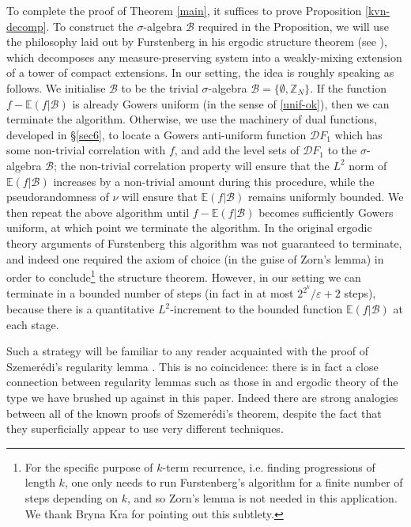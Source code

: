 \documentclass[12pt,a4paper,reqno]{amsart}
\numberwithin{equation}{section}
\theoremstyle{plain}
\theoremstyle{definition}
\def\B{{\mathcal B}}
\def\D{{\mathcal D}}
\def\Z{{\mathbb Z}}
\def\E{{\mathbb E}}
\def\eps{{\varepsilon}}
\def\vs{\vspace{11pt}}
\def\ni{\noindent}
\begin{document}
\ni To complete the proof of Theorem \ref{main}, it suffices to prove Proposition \ref{kvn-decomp}.  To construct the $\sigma$-algebra $\B$
required in the Proposition, we will use the philosophy laid out by Furstenberg in his ergodic structure theorem (see \cite{furst,FKO}), which decomposes any measure-preserving system into a weakly-mixing extension of a tower of compact extensions.  
In our setting, the idea is roughly speaking as follows.  We initialise $\B$ to be the trivial $\sigma$-algebra $\B = \{ \emptyset, \Z_N \}$.
If the function $f - \E(f|\B)$ is already Gowers uniform (in the sense of \eqref{unif-ok}), then we can terminate the algorithm.  Otherwise, we use the
machinery of dual functions, developed in \S \ref{sec6}, to locate a Gowers anti-uniform function $\D F_1$ which has some non-trivial correlation with $f$, and add the level sets of $\D F_1$ to the $\sigma$-algebra $\B$; the non-trivial correlation property will ensure that the $L^2$ norm of $\E(f|\B)$ increases by
a non-trivial amount during this procedure, while the pseudorandomness of $\nu$ will ensure that $\E(f|\B)$ remains uniformly
bounded.  We then repeat the above algorithm until $f - \E(f|\B)$ becomes sufficiently Gowers uniform,
at which point we terminate the algorithm.  In the original ergodic theory arguments of Furstenberg this algorithm was not guaranteed to terminate,
and indeed one required the axiom of choice (in the guise of Zorn's lemma) in order to conclude\footnote{For the specific purpose of $k$-term recurrence, i.e. finding progressions of length $k$, one only needs to run Furstenberg's algorithm for a finite number of steps depending on $k$, and so Zorn's lemma is not needed in this application.  We thank Bryna Kra for pointing out this subtlety.} the structure theorem.  However, in our setting
we can 
terminate in a bounded number of steps (in fact in at most $2^{2^k}/\eps + 2$ steps), because there is a quantitative
 $L^2$-increment to the bounded function $\E(f|\B)$ at each stage.\vs

\ni Such a strategy will be familiar to any reader acquainted with the proof of Szemer\'edi's regularity lemma \cite{szem-reg}. This is no coincidence: there is in fact a close connection between regularity lemmas such as those in  \cite{gowers-reg,green-reg,szem-reg} and ergodic theory of the type we have brushed up against in this paper.  Indeed there are strong analogies between all of
the known proofs of Szemer\'edi's theorem, despite the fact that they superficially appear to use
very different techniques.\vs
\end{document}
